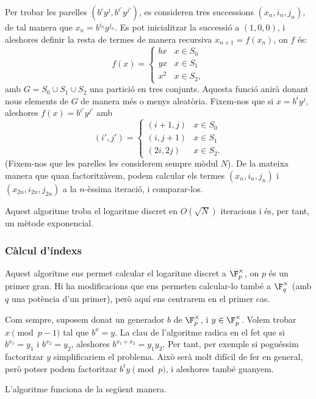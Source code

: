   Per trobar les parelles $(b^iy^j,b^{i'}y^{j'})$, es consideren tres successions $(x_n,i_n,j_n)$, de tal manera que $x_n=b^{i_n} y^{j_n}$. Es pot inicialitzar la successió a $(1,0,0)$, i aleshores definir la resta de termes de manera recursiva $x_{n+1}=f(x_n)$, on $f$ és:
  \[
  f(x) = \begin{cases}
   bx & x\in S_0\\
   yx & x\in S_1\\
   x^2 & x\in S_2,
  \end{cases}
  \]
  amb $G=S_0\cup S_1\cup S_2$ una partició en tres conjunts.
  Aquesta funció anirà donant nous elements de $G$ de manera més o menys aleatòria. Fixem-nos que si $x=b^iy^j$, aleshores $f(x)=b^{i'}y^{j'}$ amb
  \[
  (i',j') = \begin{cases}
   (i+1,j) & x\in S_0\\
   (i,j+1) & x\in S_1\\
   (2i,2j) & x\in S_2.
  \end{cases}
  \]
  (Fixem-nos que les parelles les considerem sempre mòdul $N$). De la mateixa manera que quan factoritzàvem, podem calcular els termes $(x_n,i_n,j_n)$ i $(x_{2n},i_{2n},j_{2n})$ a la $n$-èssima iteració, i comparar-los.
  
  Aquest algoritme troba el logaritme discret en $O(\sqrt{N})$ iteracions i és, per tant, un mètode exponencial.
  
  \subsubsection{Càlcul d'índexs}
  Aquest algoritme ens permet calcular el logaritme discret a $\F_p^\times$, on $p$ és un primer gran. Hi ha modificacions que ens permeten calcular-lo també a $\F_q^\times$ (amb $q$ una potència d'un primer), però aquí ens centrarem en el primer cas.
  
  Com sempre, suposem donat un generador $b$ de $\F_p^\times$, i $y\in\F_p^\times$. Volem trobar $x\pmod{p-1}$ tal que $b^x=y$. La clau de l'algoritme radica en el fet que si $b^{x_1}=y_1$ i $b^{x_2}=y_2$, aleshores $b^{x_1+x_2} = y_1y_2$. Per tant, per exemple si poguéssim factoritzar $y$ simplificariem el problema. Això serà molt difícil de fer en general, però potser podem factoritzar $b^t y\pmod p$, i aleshores també guanyem.
 
 L'algoritme funciona de la següent manera.

